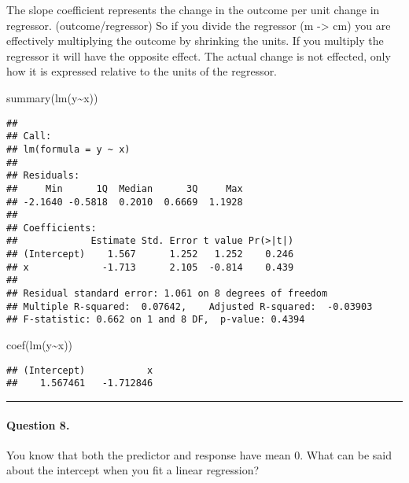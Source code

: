 \documentclass[
]{article}
\newenvironment{Shaded}{\begin{snugshade}}{\end{snugshade}}
\newcommand{\FunctionTok}[1]{\textcolor[rgb]{0.00,0.00,0.00}{#1}}
\newcommand{\NormalTok}[1]{#1}
\newcommand{\SpecialCharTok}[1]{\textcolor[rgb]{0.00,0.00,0.00}{#1}}
\begin{document}
The slope coefficient represents the change in the outcome per unit
change in regressor. (outcome/regressor) So if you divide the regressor
(m -\textgreater{} cm) you are effectively multiplying the outcome by
shrinking the units. If you multiply the regressor it will have the
opposite effect. The actual change is not effected, only how it is
expressed relative to the units of the regressor.

\begin{Shaded}
\begin{Highlighting}[]
\FunctionTok{summary}\NormalTok{(}\FunctionTok{lm}\NormalTok{(y}\SpecialCharTok{\textasciitilde{}}\NormalTok{x))}
\end{Highlighting}
\end{Shaded}

\begin{verbatim}
## 
## Call:
## lm(formula = y ~ x)
## 
## Residuals:
##     Min      1Q  Median      3Q     Max 
## -2.1640 -0.5818  0.2010  0.6669  1.1928 
## 
## Coefficients:
##             Estimate Std. Error t value Pr(>|t|)
## (Intercept)    1.567      1.252   1.252    0.246
## x             -1.713      2.105  -0.814    0.439
## 
## Residual standard error: 1.061 on 8 degrees of freedom
## Multiple R-squared:  0.07642,    Adjusted R-squared:  -0.03903 
## F-statistic: 0.662 on 1 and 8 DF,  p-value: 0.4394
\end{verbatim}

\begin{Shaded}
\begin{Highlighting}[]
\FunctionTok{coef}\NormalTok{(}\FunctionTok{lm}\NormalTok{(y}\SpecialCharTok{\textasciitilde{}}\NormalTok{x))}
\end{Highlighting}
\end{Shaded}

\begin{verbatim}
## (Intercept)           x 
##    1.567461   -1.712846
\end{verbatim}

\begin{center}\rule{0.5\linewidth}{0.5pt}\end{center}

\hypertarget{question-8.}{%
\paragraph{Question 8.}\label{question-8.}}

You know that both the predictor and response have mean 0. What can be
said about the intercept when you fit a linear regression?
\end{document}
